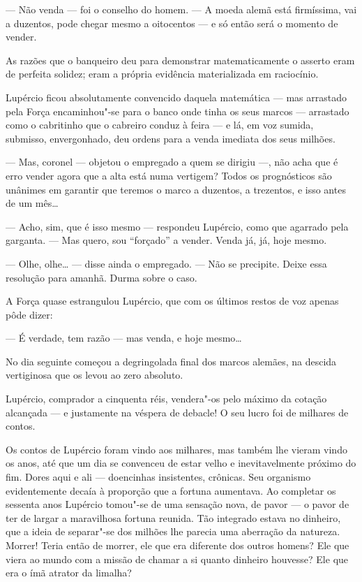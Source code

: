 --- Não venda --- foi o conselho do homem. --- A moeda alemã está
firmíssima, vai a duzentos, pode chegar mesmo a oitocentos --- e só
então será o momento de vender.

As razões que o banqueiro deu para demonstrar matematicamente o asserto
eram de perfeita solidez; eram a própria evidência materializada em
raciocínio.

Lupércio ficou absolutamente convencido daquela matemática --- mas
arrastado pela Força encaminhou"-se para o banco onde tinha os seus
marcos --- arrastado como o cabritinho que o cabreiro conduz à feira ---
e lá, em voz sumida, submisso, envergonhado, deu ordens para a venda
imediata dos seus milhões.

--- Mas, coronel --- objetou o empregado a quem se dirigiu ---, não acha
que é erro vender agora que a alta está numa vertigem? Todos os
prognósticos são unânimes em garantir que teremos o marco a duzentos, a
trezentos, e isso antes de um mês\ldots{}

--- Acho, sim, que é isso mesmo --- respondeu Lupércio, como que
agarrado pela garganta. --- Mas quero, sou ``forçado'' a vender. Venda
já, já, hoje mesmo.

--- Olhe, olhe\ldots{} --- disse ainda o empregado. --- Não se precipite.
Deixe essa resolução para amanhã. Durma sobre o caso.

A Força quase estrangulou Lupércio, que com os últimos restos de voz
apenas pôde dizer:

--- É verdade, tem razão --- mas venda, e hoje mesmo\ldots{}

No dia seguinte começou a degringolada final dos marcos alemães, na
descida vertiginosa que os levou ao zero absoluto.

Lupércio, comprador a cinquenta réis, vendera"-os pelo máximo da cotação
alcançada --- e justamente na véspera de debacle! O seu lucro foi de
milhares de contos.

Os contos de Lupércio foram vindo aos milhares, mas também lhe vieram
vindo os anos, até que um dia se convenceu de estar velho e
inevitavelmente próximo do fim. Dores aqui e ali --- doencinhas
insistentes, crônicas. Seu organismo evidentemente decaía à proporção
que a fortuna aumentava. Ao completar os sessenta anos Lupércio tomou"-se
de uma sensação nova, de pavor --- o pavor de ter de largar a
maravilhosa fortuna reunida. Tão integrado estava no dinheiro, que a
ideia de separar"-se dos milhões lhe parecia uma aberração da natureza.
Morrer! Teria então de morrer, ele que era diferente dos outros homens?
Ele que viera ao mundo com a missão de chamar a si quanto dinheiro
houvesse? Ele que era o ímã atrator da limalha?

